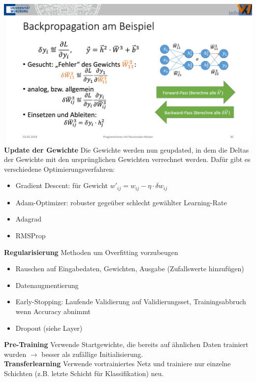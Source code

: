 \documentclass[12pt]{article}
\begin{document}
	\includegraphics[width=\linewidth]{figures/calculate-delta-weights.png}\\
	\textbf{Update der Gewichte} Die Gewichte werden nun geupdated, in dem die Deltas der Gewichte mit den ursprünglichen Gewichten verrechnet werden. Dafür gibt es verschiedene Optimierungsverfahren:
	\begin{itemize}
		\item Gradient Descent: für Gewicht $w'_{ij} = w_{ij} - \eta \cdot \delta w_{ij}$
		\item Adam-Optimizer: robuster gegeüber schlecht gewählter Learning-Rate
		\item Adagrad
		\item RMSProp
	\end{itemize}
	\textbf{Regularisierung} Methoden um Overfitting vorzubeugen
	\begin{itemize}
		\item Rauschen auf Eingabedaten, Gewichten, Ausgabe (Zufallswerte hinzufügen)
		\item Datenaugmentierung
		\item Early-Stopping: Laufende Validierung auf Validierungsset, Trainingsabbruch wenn Accuracy abnimmt
		\item Dropout (siehe Layer)
		
	\end{itemize}
	\textbf{Pre-Training} Verwende Startgewichte, die bereits auf ähnlichen Daten trainiert wurden $\rightarrow$ besser als zufällige Initialisierung.\\
	\textbf{Transferlearning} Verwende vortrainiertes Netz und trainiere nur einzelne Schichten (z.B. letzte Schicht für Klassifikation) neu.
\end{document}
